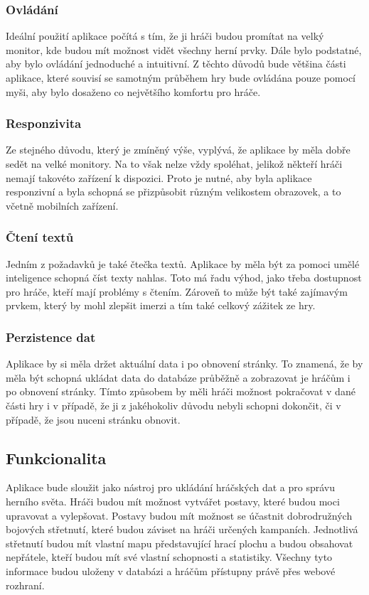 \subsubsection*{Ovládání}
Ideální použití aplikace počítá s tím, že ji hráči budou promítat na velký monitor, kde budou mít možnost vidět všechny herní prvky. Dále bylo podstatné, aby bylo ovládání jednoduché a intuitivní. Z těchto důvodů bude většina části aplikace, které souvisí se samotným průběhem hry bude ovládána pouze pomocí myši, aby bylo dosaženo co největšího komfortu pro hráče.

\subsubsection*{Responzivita}
Ze stejného důvodu, který je zmíněný výše, vyplývá, že aplikace by měla dobře sedět na velké monitory. Na to však nelze vždy spoléhat, jelikož někteří hráči nemají takovéto zařízení k dispozici. Proto je nutné, aby byla aplikace responzivní a byla schopná se přizpůsobit různým velikostem obrazovek, a to včetně mobilních zařízení.

\subsubsection*{Čtení textů}
Jedním z požadavků je také čtečka textů. Aplikace by měla být za pomoci umělé inteligence schopná číst texty nahlas. Toto má řadu výhod, jako třeba dostupnost pro hráče, kteří mají problémy s čtením. Zároveň to může být také zajímavým prvkem, který by mohl zlepšit imerzi a tím také celkový zážitek ze hry.

\subsubsection*{Perzistence dat}
Aplikace by si měla držet aktuální data i po obnovení stránky. To znamená, že by měla být schopná ukládat data do databáze průběžně a zobrazovat je hráčům i po obnovení stránky. Tímto způsobem by měli hráči možnost pokračovat v dané části hry i v případě, že ji z jakéhokoliv důvodu nebyli schopni dokončit, či v případě, že jsou nuceni stránku obnovit.

\subsection{Funkcionalita}
Aplikace bude sloužit jako nástroj pro ukládání hráčských dat a pro správu herního světa. Hráči budou mít možnost vytvářet postavy, které budou moci upravovat a vylepšovat. Postavy budou mít možnost se účastnit dobrodružných bojových střetnutí, které budou záviset na hráči určených kampaních. Jednotlivá střetnutí budou mít vlastní mapu představující hrací plochu a budou obsahovat nepřátele, kteří budou mít své vlastní schopnosti a statistiky. Všechny tyto informace budou uloženy v databázi a hráčům přístupny právě přes webové rozhraní.

